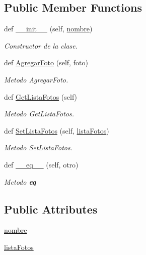 \subsection*{Public Member Functions}
\begin{DoxyCompactItemize}
\item 
def \hyperlink{class_model_1_1_sujeto_1_1_sujeto_a5f8c85184dd79e8515e94ce2b4788848}{\+\_\+\+\_\+init\+\_\+\+\_\+} (self, \hyperlink{class_model_1_1_sujeto_1_1_sujeto_a5d96264282bc196e9c0c7d5800837c37}{nombre})
\begin{DoxyCompactList}\small\item\em Constructor de la clase. \end{DoxyCompactList}\item 
def \hyperlink{class_model_1_1_sujeto_1_1_sujeto_af477cb1cdb31865d8bba6c7544d2a5ac}{Agregar\+Foto} (self, foto)
\begin{DoxyCompactList}\small\item\em Metodo Agregar\+Foto. \end{DoxyCompactList}\item 
def \hyperlink{class_model_1_1_sujeto_1_1_sujeto_a3e6841ef56eaf3a0c918fd7ee6c7e05d}{Get\+Lista\+Fotos} (self)
\begin{DoxyCompactList}\small\item\em Metodo Get\+Lista\+Fotos. \end{DoxyCompactList}\item 
def \hyperlink{class_model_1_1_sujeto_1_1_sujeto_acce1a348d76576f060bc5172f641f0ce}{Set\+Lista\+Fotos} (self, \hyperlink{class_model_1_1_sujeto_1_1_sujeto_ad0257b41836e860b153a1194e1ddab93}{lista\+Fotos})
\begin{DoxyCompactList}\small\item\em Metodo Set\+Lista\+Fotos. \end{DoxyCompactList}\item 
def \hyperlink{class_model_1_1_sujeto_1_1_sujeto_ae634c9ff586c967fd085d0bcfee155e6}{\+\_\+\+\_\+eq\+\_\+\+\_\+} (self, otro)
\begin{DoxyCompactList}\small\item\em Metodo {\bfseries eq} \end{DoxyCompactList}\end{DoxyCompactItemize}
\subsection*{Public Attributes}
\begin{DoxyCompactItemize}
\item 
\hyperlink{class_model_1_1_sujeto_1_1_sujeto_a5d96264282bc196e9c0c7d5800837c37}{nombre}
\item 
\hyperlink{class_model_1_1_sujeto_1_1_sujeto_ad0257b41836e860b153a1194e1ddab93}{lista\+Fotos}
\end{DoxyCompactItemize}


